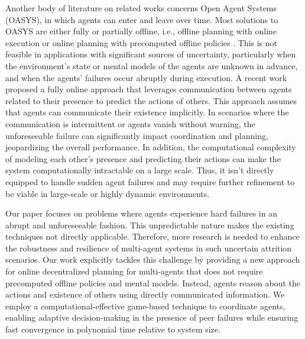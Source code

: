 Another body of literature on related works concerns Open Agent Systems (OASYS), in which agents can enter and leave over time. Most solutions to OASYS are either fully or partially offline, i.e., offline planning with online execution \citep{cohen2017open, chandrasekaran2016individual} or online planning with precomputed offline policies \citep{eck2020scalable}. This is not feasible in applications with significant sources of uncertainty, particularly when the environment's state or mental models of the agents are unknown in advance, and when the agents' failures occur abruptly during execution. A recent work \citep{kakarlapudi2022decision} proposed a fully online approach that leverages communication between agents related to their presence to predict the actions of others. This approach assumes that agents can communicate their existence implicitly. In scenarios where the communication is intermittent or agents vanish without warning, the unforeseeable failure can significantly impact coordination and planning, jeopardizing the overall performance. In addition, the computational complexity of modeling each other's presence and predicting their actions can make the system computationally intractable on a large scale. Thus, it isn't directly equipped to handle sudden agent failures and may require further refinement to be viable in large-scale or highly dynamic environments.

Our paper focuses on problems where agents experience hard failures in an abrupt and unforeseeable fashion. This unpredictable nature makes the existing techniques not directly applicable. Therefore, more research is needed to enhance the robustness and resilience of multi-agent systems in such uncertain attrition scenarios. Our work explicitly tackles this challenge by providing a new approach for online decentralized planning for multi-agents that does not require precomputed offline policies and mental models. Instead, agents reason about the actions and existence of others using directly communicated information.
We employ a computational-effective game-based technique to coordinate agents, enabling adaptive decision-making in the presence of peer failures while ensuring fast convergence in polynomial time relative to system size.